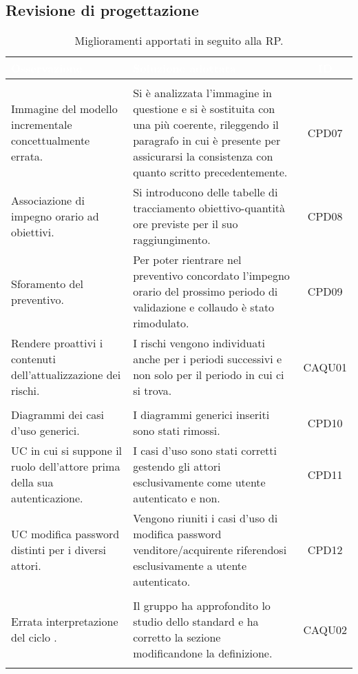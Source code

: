 \subsection{Revisione di progettazione}
\begin{longtable}{|C{4cm}|C{9cm}|c|}
	\textcolor{white}{\textbf{Osservazione}}&
	\textcolor{white}{\textbf{Soluzione adottata}}&
	\textcolor{white}{\textbf{ID}}\label{tab:CriticitàRP}\\ \hline
	\\ \hline
	Immagine del modello incrementale concettualmente errata. & Si è analizzata l'immagine in questione e si è sostituita con una più coerente, rileggendo il paragrafo in cui è presente per assicurarsi la consistenza con quanto scritto precedentemente. & CPD07  \\ \hline
	Associazione di impegno orario ad obiettivi. & Si introducono delle tabelle di tracciamento obiettivo-quantità ore previste per il suo raggiungimento. & CPD08 \\ \hline
	Sforamento del preventivo. & Per poter rientrare nel preventivo concordato l'impegno orario del prossimo periodo di validazione e collaudo è stato rimodulato. & CPD09 \\ \hline
	Rendere proattivi i contenuti dell'attualizzazione dei rischi. & I rischi vengono individuati anche per i periodi successivi e non solo per il periodo in cui ci si trova. & CAQU01 \\ \hline
	\\ \hline
	Diagrammi dei casi d'uso generici. & I diagrammi generici inseriti sono stati rimossi. & CPD10  \\ \hline
	UC in cui si suppone il ruolo dell'attore prima della sua autenticazione. & I casi d'uso sono stati corretti gestendo gli attori esclusivamente come utente autenticato e non. & CPD11 \\ \hline
	UC modifica password distinti per i diversi attori. & Vengono riuniti i casi d'uso di modifica password venditore/acquirente riferendosi esclusivamente a utente autenticato. & CPD12 \\ \hline
	\\ \hline
	Errata interpretazione del ciclo . & Il gruppo ha approfondito lo studio dello standard e ha corretto la sezione modificandone la definizione. & CAQU02 \\ \hline
	\caption{Miglioramenti apportati in seguito alla RP.}\\
\end{longtable}
